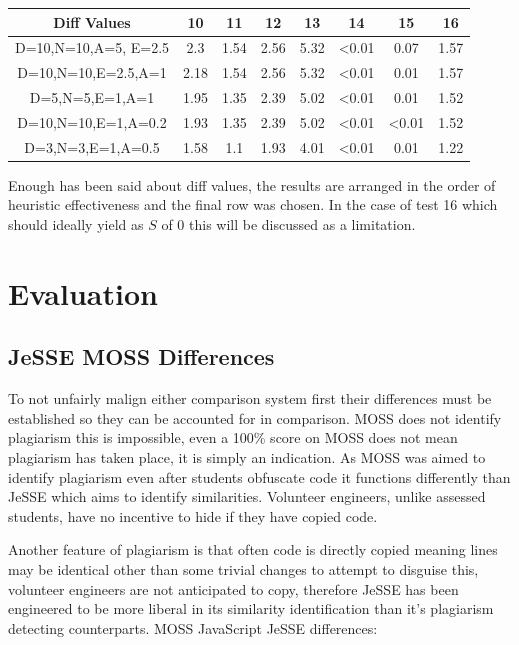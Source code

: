 \documentclass[jou,apacite]{apa6}
\begin{document}
\setlength{\tabcolsep}{1pt}
\renewcommand{\arraystretch}{1.5}

\begin{center}
 \begin{tabular}{||c c c c c c c c ||} 
 \hline
 Diff Values & 10 & 11 & 12 & 13 & 14 & 15 & 16 \\ [-0.2ex] 
 \hline\hline
 D=10,N=10,A=5, E=2.5 & 2.3 & 1.54 & 2.56 & 5.32 & <0.01 & 0.07 & 1.57 \\ 
 \hline
 D=10,N=10,E=2.5,A=1  & 2.18 & 1.54 & 2.56 & 5.32 & <0.01 & 0.01 & 1.57  \\
 \hline
 D=5,N=5,E=1,A=1  & 1.95 & 1.35 & 2.39 & 5.02 & <0.01 & 0.01 & 1.52  \\
 \hline
  D=10,N=10,E=1,A=0.2  & 1.93 & 1.35 & 2.39 & 5.02 & <0.01 & <0.01 & 1.52  \\
  \hline
    D=3,N=3,E=1,A=0.5  & 1.58 & 1.1 & 1.93 & 4.01 & <0.01 & 0.01 & 1.22 \\
  \hline
\end{tabular}
\end{center}

Enough has been said about diff values, the results are arranged in the order of heuristic effectiveness and the final row was chosen. In the case of test 16 which should ideally yield as $S$ of 0 this will be discussed as a limitation.

\section{Evaluation}
\subsection{JeSSE MOSS Differences}
To not unfairly malign either comparison system first their differences must be established so they can be accounted for in comparison.  MOSS does not identify plagiarism this is impossible, even a 100\% score on MOSS does not mean plagiarism has taken place, it is simply an indication. As MOSS was aimed to identify plagiarism even after students obfuscate code it functions differently than JeSSE which aims to identify similarities. Volunteer engineers, unlike assessed students,  have no incentive to hide if they have copied code.

Another feature of plagiarism is that often code is directly copied meaning lines may be identical other than some trivial changes to attempt to disguise this, volunteer engineers are not anticipated to copy, therefore JeSSE has been engineered to be more liberal in its similarity identification than it’s plagiarism detecting counterparts. MOSS JavaScript JeSSE differences: 
\end{document}
